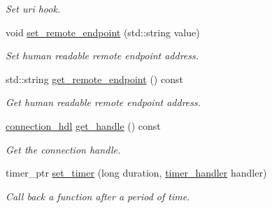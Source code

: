 \begin{DoxyCompactItemize}
\begin{DoxyCompactList}\small\item\em Set uri hook. \end{DoxyCompactList}\item 
void \mbox{\hyperlink{classwebsocketpp_1_1transport_1_1stub_1_1connection_a33b09a9683c924a15bb536613c4685c9}{set\+\_\+remote\+\_\+endpoint}} (std\+::string value)
\begin{DoxyCompactList}\small\item\em Set human readable remote endpoint address. \end{DoxyCompactList}\item 
std\+::string \mbox{\hyperlink{classwebsocketpp_1_1transport_1_1stub_1_1connection_a7e7692636f506e0b504b4839bfc71c6c}{get\+\_\+remote\+\_\+endpoint}} () const
\begin{DoxyCompactList}\small\item\em Get human readable remote endpoint address. \end{DoxyCompactList}\item 
\mbox{\hyperlink{namespacewebsocketpp_a6b3d26a10ee7229b84b776786332631d}{connection\+\_\+hdl}} \mbox{\hyperlink{classwebsocketpp_1_1transport_1_1stub_1_1connection_a7e21eb9d7ca9354603c9068b31d43a94}{get\+\_\+handle}} () const
\begin{DoxyCompactList}\small\item\em Get the connection handle. \end{DoxyCompactList}\item 
timer\+\_\+ptr \mbox{\hyperlink{classwebsocketpp_1_1transport_1_1stub_1_1connection_a0566c24deef4c7e5bff957510c366b26}{set\+\_\+timer}} (long duration, \mbox{\hyperlink{namespacewebsocketpp_1_1transport_a946cc56ff41139f3002149c15fd87bc9}{timer\+\_\+handler}} handler)
\begin{DoxyCompactList}\small\item\em Call back a function after a period of time. \end{DoxyCompactList}\end{DoxyCompactItemize}
